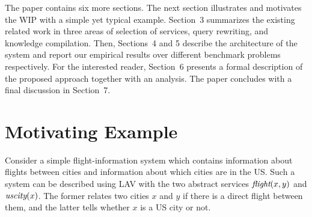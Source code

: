 \documentclass{llncs}
\newcommand{\flight}{\text{\it flight}}
\newcommand{\UScity}{\text{\it uscity}}
\begin{document}
The paper contains six more sections. The next section illustrates and
motivates the WIP with a simple yet typical example. Section~3 summarizes
the existing related work in three areas of selection of services,
query rewriting, and knowledge compilation.
Then, Sections~4 and 5 describe the architecture of the system and 
report our empirical results over different benchmark problems
respectively.
For the interested reader, Section~6 presents a formal description
of the proposed approach together with an analysis.
The paper concludes with a final discussion in Section~7.

\section{Motivating Example}

Consider a simple flight-information system which contains information
about flights between cities and information about which cities are in
the US. Such a system can be described using LAV with the two abstract
services $\flight(x,y)$ and $\UScity(x)$. The former relates two cities
$x$ and $y$ if there is a direct flight between them, and the latter tells
whether $x$ is a US city or not.
\end{document}
